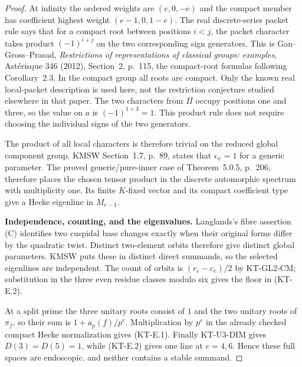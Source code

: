 \documentclass[11pt,a4paper]{article}
\theoremstyle{definition}
\renewcommand{\paragraph}[1]{\par\smallskip\noindent\textbf{#1}\quad\ignorespaces}
\begin{document}
\begin{proof}
At infinity the ordered weights are $(e,0,-e)$ and the compact
member has coefficient highest weight $(e-1,0,1-e)$.
The real discrete-series packet rule says that for a compact
root between positions $i<j$, the packet character takes product
$(-1)^{i+j}$ on the two corresponding sign generators.
This is Gan--Gross--Prasad, \emph{Restrictions of representations
of classical groups: examples}, Ast\'erisque 346 (2012),
Section~2, p.~115, the compact-root formulas following
Corollary~2.3. In the compact group all roots are compact.
Only the known real local-packet description is used here,
not the restriction conjecture studied elsewhere in that paper.
The two characters from $\Pi$ occupy positions one and three,
so the value on $a$ is $(-1)^{1+3}=1$.
This product rule does not require choosing the individual signs
of the two generators.

The product of all local characters is therefore trivial on
the reduced global component group. KMSW Section~1.7,
p.~89, states that $\epsilon_\psi=1$ for a generic parameter.
The proved generic/pure-inner case of Theorem~5.0.5, p.~206,
therefore places the chosen tensor product in the discrete
automorphic spectrum with multiplicity one. Its finite
$K$-fixed vector and its compact coefficient type give a
Hecke eigenline in $M_{e-1}$.

\paragraph{Independence, counting, and the eigenvalues.}
Langlands's fibre assertion (C) identifies two cuspidal base
changes exactly when their original forms differ by the
quadratic twist. Distinct two-element orbits therefore give
distinct global parameters. KMSW puts these in distinct
direct summands, so the selected eigenlines are independent.
The count of orbits is $(r_e-c_e)/2$ by KT-GL2-CM;
substitution in the three even residue classes modulo six
gives the floor in (KT-E.2).

At a split prime the three unitary roots consist of $1$ and
the two unitary roots of $\pi_f$, so their sum is
$1+a_p(f)/p^e$. Multiplication by $p^e$ in the already checked
compact Hecke normalization gives (KT-E.1).
Finally KT-U3-DIM gives $D(3)=D(5)=1$, while (KT-E.2)
gives one line at $e=4,6$. Hence these full spaces are
endoscopic, and neither contains a stable summand.
\end{proof}
\end{document}
